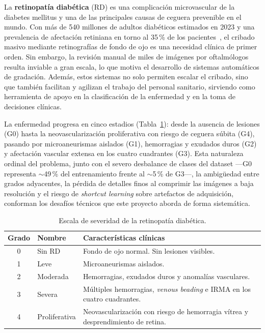 \documentclass[12pt, a4paper]{article}
\begin{document}
La \textbf{retinopatía diabética} (RD) es una complicación microvascular de la
diabetes mellitus y una de las principales causas de ceguera prevenible en el mundo.
Con más de 540 millones de adultos diabéticos estimados en 2023 y una prevalencia
de afectación retiniana en torno al 35\,\% de los pacientes~\cite{idf2023,who2023},
el cribado masivo mediante retinografías de fondo de ojo es una necesidad clínica
de primer orden. Sin embargo, la revisión manual de miles de imágenes por
oftalmólogos resulta inviable a gran escala, lo que motiva el desarrollo de sistemas
automáticos de gradación. Además, estos sistemas no solo permiten escalar el
cribado, sino que también facilitan y agilizan el trabajo del personal sanitario,
sirviendo como herramienta de apoyo en la clasificación de la enfermedad y en la
toma de decisiones clínicas.

La enfermedad progresa en cinco estadios (Tabla~\ref{tab:grados}): desde la ausencia
de lesiones (G0) hasta la neovascularización proliferativa con riesgo de ceguera súbita
(G4), pasando por microaneurismas aislados (G1), hemorragias y exudados duros (G2) y
afectación vascular extensa en los cuatro cuadrantes (G3). Esta naturaleza ordinal del
problema, junto con el severo desbalance de clases del dataset ---G0 representa
$\sim$49\,\% del entrenamiento frente al $\sim$5\,\% de G3---, la ambigüedad entre
grados adyacentes, la pérdida de detalles finos al comprimir las imágenes a baja
resolución y el riesgo de \textit{shortcut learning} sobre artefactos de adquisición,
conforman los desafíos técnicos que este proyecto aborda de forma sistemática.

\begin{table}[H]
  \centering
  \caption{Escala de severidad de la retinopatía diabética.}
  \label{tab:grados}
  \begin{tabularx}{0.9\textwidth}{c l X}
    \toprule
    \rowcolor{azuloscuro!15}
    \textbf{Grado} & \textbf{Nombre} & \textbf{Características clínicas} \\
    \midrule
    0 & Sin RD        & Fondo de ojo normal. Sin lesiones visibles. \\
    \rowcolor{grisclaro}
    1 & Leve          & Microaneurismas aislados. \\
    2 & Moderada      & Hemorragias, exudados duros y anomalías vasculares. \\
    \rowcolor{grisclaro}
    3 & Severa        & Múltiples hemorragias, \textit{venous beading} e IRMA
                        en los cuatro cuadrantes. \\
    4 & Proliferativa & Neovascularización con riesgo de hemorragia vítrea
                        y desprendimiento de retina. \\
    \bottomrule
  \end{tabularx}
\end{table}
\end{document}
